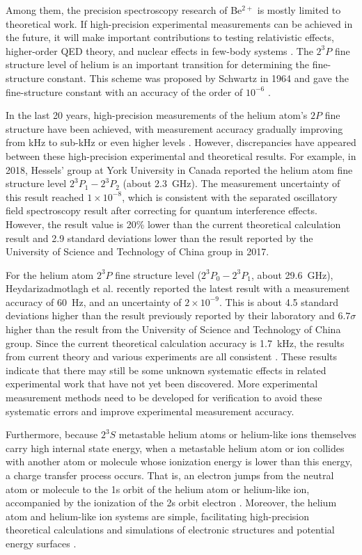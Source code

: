 \documentclass[12pt,a4paper]{article}
\begin{document}
Among them, the precision spectroscopy research of Be$^{2+}$ is mostly limited to theoretical work. If high-precision experimental measurements can be achieved in the future, it will make important contributions to testing relativistic effects, higher-order QED theory, and nuclear effects in few-body systems \cite{ref10,ref33}. The $2^3P$ fine structure level of helium is an important transition for determining the fine-structure constant. This scheme was proposed by Schwartz in 1964 and gave the fine-structure constant with an accuracy of the order of $10^{-6}$ \cite{ref21}.

In the last 20 years, high-precision measurements of the helium atom's $2P$ fine structure have been achieved, with measurement accuracy gradually improving from kHz to sub-kHz or even higher levels \cite{ref1,ref7,ref10,ref11,ref14,ref16-18}. However, discrepancies have appeared between these high-precision experimental and theoretical results. For example, in 2018, Hessels' group at York University in Canada reported the helium atom fine structure level $2^3P_1 - 2^3P_2$ (about \SI{2.3}{GHz}). The measurement uncertainty of this result reached $1 \times 10^{-8}$, which is consistent with the separated oscillatory field spectroscopy result after correcting for quantum interference effects. However, the result value is 20\% lower than the current theoretical calculation result and 2.9 standard deviations lower than the result reported by the University of Science and Technology of China group in 2017.

For the helium atom $2^3P$ fine structure level ($2^3P_0 - 2^3P_1$, about \SI{29.6}{GHz}), Heydarizadmotlagh et al. recently reported the latest result with a measurement accuracy of \SI{60}{Hz}, and an uncertainty of $2 \times 10^{-9}$. This is about 4.5 standard deviations higher than the result previously reported by their laboratory \cite{ref18} and $6.7\sigma$ higher than the result from the University of Science and Technology of China group. Since the current theoretical calculation accuracy is \SI{1.7}{kHz}, the results from current theory and various experiments are all consistent \cite{ref20}. These results indicate that there may still be some unknown systematic effects in related experimental work that have not yet been discovered. More experimental measurement methods need to be developed for verification to avoid these systematic errors and improve experimental measurement accuracy.

Furthermore, because $2^3S$ metastable helium atoms or helium-like ions themselves carry high internal state energy, when a metastable helium atom or ion collides with another atom or molecule whose ionization energy is lower than this energy, a charge transfer process occurs. That is, an electron jumps from the neutral atom or molecule to the 1s orbit of the helium atom or helium-like ion, accompanied by the ionization of the 2s orbit electron \cite{ref22-24}. Moreover, the helium atom and helium-like ion systems are simple, facilitating high-precision theoretical calculations and simulations of electronic structures and potential energy surfaces \cite{ref25,ref36}.
\end{document}
